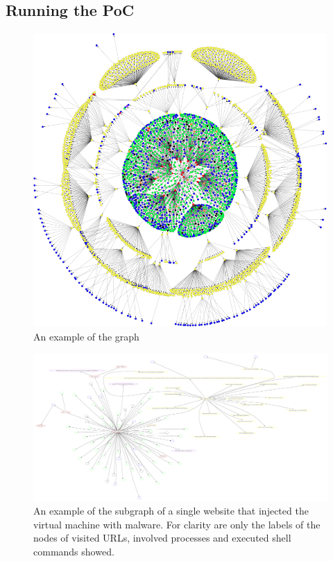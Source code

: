 \subsection{Running the PoC}
\begin{figure}[h]
    \centering
    \includegraphics[width=17cm]{Images/graph2.png}
    \caption{An example of the graph}
    \label{fig:graph}
\end{figure}
\begin{figure}[h]
    \centering
    \includegraphics[width=25cm, angle=90]{Images/report_Subprocess_from_tab}
    \caption{An example of the subgraph of a single website that injected the virtual machine with malware. For clarity are only the labels of the nodes of visited URLs, involved processes and executed shell commands showed.}
    \label{fig:subgraph}
\end{figure}

